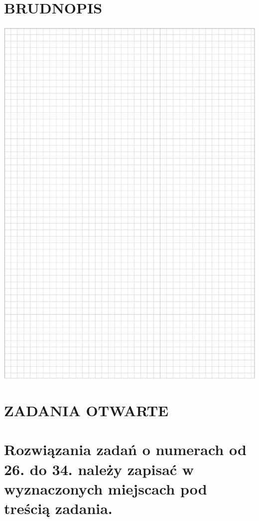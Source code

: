 \documentclass[10pt]{article}
\begin{document}
\section*{BRUDNOPIS}
\begin{center}
\includegraphics[max width=\textwidth]{2024_11_21_3a102e13f4b06a61f46fg-09}
\end{center}

\section*{ZADANIA OTWARTE}
\section*{Rozwiązania zadań o numerach od 26. do 34. należy zapisać w wyznaczonych miejscach pod treścią zadania.}
\end{document}
